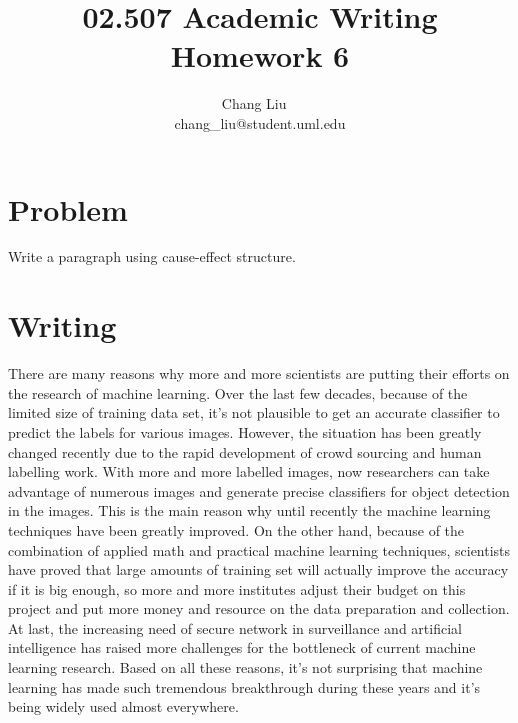 \documentclass{article}
\title{02.507 Academic Writing Homework 6}
\author{Chang Liu ~\\ chang\_liu@student.uml.edu}
\begin{document}
\maketitle

\section{Problem}

Write a paragraph using cause-effect structure.

\section{Writing}

\large{

There are many reasons why more and more scientists are putting their efforts on the research of machine learning. Over the last few decades, because of the limited size of training data set, it's not plausible to get an accurate classifier to predict the labels for various images. However, the situation has been greatly changed recently due to the rapid development of crowd sourcing and human labelling work. With more and more labelled images, now researchers can take advantage of numerous images and generate precise classifiers for object detection in the images. This is the main reason why until recently the machine learning techniques have been greatly improved. On the other hand, because of the combination of applied math and practical machine learning techniques, scientists have proved that large amounts of training set will actually improve the accuracy if it is big enough, so more and more institutes adjust their budget on this project and put more money and resource on the data preparation and collection. At last, the increasing need of secure network in surveillance and artificial intelligence has raised more challenges for the bottleneck of current machine learning research. Based on all these reasons, it's not surprising that machine learning has made such tremendous breakthrough during these years and it's being widely used almost everywhere.

}
\end{document}
